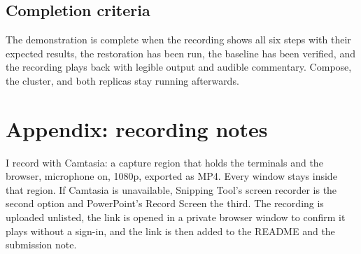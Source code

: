 \documentclass[11pt,letterpaper]{article}
\begin{document}
\subsection*{Completion criteria}
The demonstration is complete when the recording shows all six steps with their expected results, the restoration has been run, the baseline has been verified, and the recording plays back with legible output and audible commentary. Compose, the cluster, and both replicas stay running afterwards.

\section*{Appendix: recording notes}

I record with Camtasia: a capture region that holds the terminals and the browser, microphone on, 1080p, exported as MP4. Every window stays inside that region. If Camtasia is unavailable, Snipping Tool's screen recorder is the second option and PowerPoint's Record Screen the third. The recording is uploaded unlisted, the link is opened in a private browser window to confirm it plays without a sign-in, and the link is then added to the README and the submission note.
\end{document}
